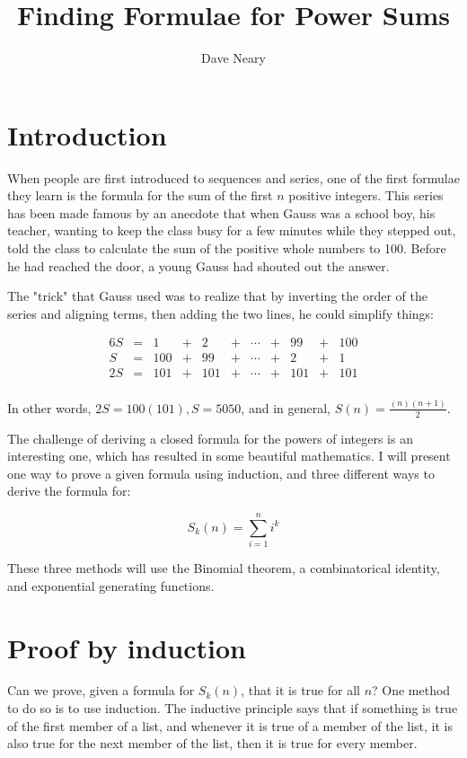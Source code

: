 \documentclass{article}
\begin{document}
\title{Finding Formulae for Power Sums}
\author{Dave Neary}

\maketitle

\section{Introduction}

When people are first introduced to sequences and series, one of the first formulae
they learn is the formula for the sum of the first $n$ positive integers. This 
series has been made famous by an anecdote that when Gauss was a school boy, his
teacher, wanting to keep the class busy for a few minutes while they stepped out,
told the class to calculate the sum of the positive whole numbers to 100. Before he
had reached the door, a young Gauss had shouted out the answer.

The "trick" that Gauss used was to realize that by inverting the order of the series
and aligning terms, then adding the two lines, he could simplify things:

\begin{alignat*}{6}
	S &=& 1   &+& 2  &+& \cdots &+& 99 &+& 100 \\
	 S &=& 100 &+& 99 &+& \cdots &+& 2  &+& 1 \\
	2S &=& 101 &+& 101 &+& \cdots &+& 101 &+& 101 \\
\end{alignat*}

In other words, $2S = 100(101), S=5050$, and in general, $S(n) = \frac{(n)(n+1)}{2}$.

The challenge of deriving a closed formula for the powers of integers is an
interesting one, which has resulted in some beautiful mathematics. I will present
one way to prove a given formula using induction, and three different ways to derive
the formula for:

\[ S_k(n) = \sum_{i=1}^{n} i^k \]

These three methods will use the Binomial theorem, a combinatorical identity, and
exponential generating functions.

\section{Proof by induction}

Can we prove, given a formula for $S_k(n)$, that it is true for all $n$? One method
to do so is to use induction. The inductive principle says that if something is true
of the first member of a list, and whenever it is true of a member of the list,
it is also true for the next member of the list, then it is true for every member.
\end{document}
